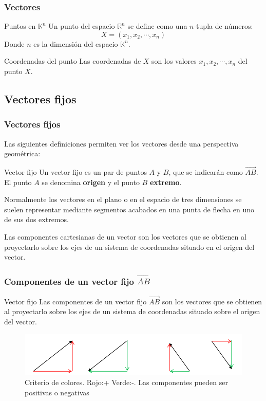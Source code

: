 \documentclass{beamer}
\begin{document}
\begin{frame}
  \frametitle{Vectores}
  \begin{block}{Puntos en $\mathbb{K}^n$}
Un punto del espacio $\mathbb{R}^n$ se define como una $n$-tupla de n\'umeros:
\[X=(x_1,x_2,\cdots,x_n)\]
Donde $n$ es la dimensi\'on del espacio $\mathbb{K}^n$.
  \end{block}

  \begin{block}{Coordenadas del punto}
Las coordenadas de $X$ son los valores $x_1,x_2,\cdots, x_n$ del punto $X$.
  \end{block}

\end{frame}

\subsection{Vectores fijos}

\begin{frame}
  \frametitle{Vectores fijos}
Las siguientes definiciones permiten ver los vectores desde una perspectiva geom\'etrica:
  \begin{block}{Vector fijo}
Un vector fijo es un par de puntos $A$ y $B$, que se indicar\'an como $\vec{AB}$. El punto $A$ se denomina \textbf{origen} y el punto $B$ \textbf{extremo}.
  \end{block}

Normalmente los vectores en el plano o en el espacio de tres dimensiones se suelen representar mediante segmentos acabados en una punta de flecha en uno de sus dos extremos.
  
\end{frame}

Las componentes cartesianas de un vector son los vectores que se obtienen al proyectarlo sobre los ejes de un sistema de coordenadas situado en el origen del vector.


\begin{frame}
  \frametitle{Componentes de un vector fijo $\vec{AB}$ }
  \begin{block}{Vector fijo}
Las componentes de un vector fijo $\vec{AB}$ son los vectores que se obtienen al proyectarlo sobre los ejes de un sistema de coordenadas situado sobre el origen del vector.
\end{block}



\begin{figure}[h]
\caption{Criterio de colores. {\color{red}Rojo}:+ {\color{green}Verde}:-. Las  componentes pueden ser positivas o negativas}
    \label{fig:vectores}
\centering
\includegraphics[width=\textwidth]{vectors}
\end{figure}


\end{frame}
\end{document}
